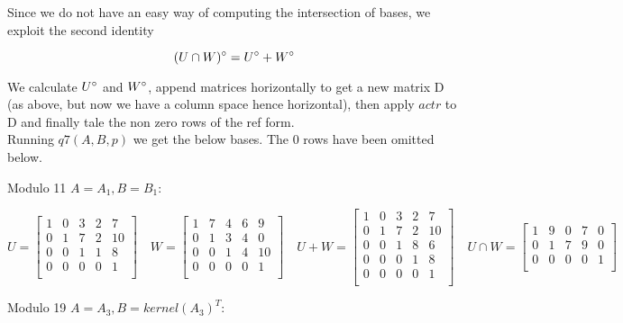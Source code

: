 \documentclass[10pt,a4paper]{report}
\begin{document}
Since we do not have an easy way of computing the intersection of bases, we exploit the second identity 

\begin{equation*}
(U \cap W)\degree = U\degree + W\degree
\end{equation*} 

We calculate $U\degree$ and $W\degree$, append matrices horizontally to get a new matrix D (as above, but now we have a column space hence horizontal), then apply $actr$ to D and finally tale the non zero rows of the ref form.\\

Running $q7(A,B,p)$ we get the below bases. The 0 rows have been omitted below.

\newpage

Modulo 11 $A=A_1, B=B_1$:

\begin{equation*}
U=\begin{bmatrix}
1 & 0 & 3 & 2 & 7 \\
0 & 1 & 7 & 2 & 10\\
0 & 0 & 1 & 1 & 8\\
0 & 0 & 0 & 0 & 1\\
\end{bmatrix}
\quad  
W=\begin{bmatrix}
1 & 7 & 4 & 6 & 9 \\
0 & 1 & 3 & 4 & 0\\
0 & 0 & 1 & 4 & 10\\
0 & 0 & 0 & 0 & 1\\
\end{bmatrix}
\quad 
U+W=\begin{bmatrix}
1 & 0 & 3 & 2 & 7 \\
0 & 1 & 7 & 2 & 10\\
0 & 0 & 1 & 8 & 6\\
0 & 0 & 0 & 1 & 8\\
0 & 0 & 0 & 0 & 1\\
\end{bmatrix}
\quad 
U \cap W=\begin{bmatrix}
1 & 9 & 0 & 7 & 0 \\
0 & 1 & 7 & 9 & 0\\
0 & 0 & 0 & 0 & 1\\
\end{bmatrix}
\end{equation*}

\vspace{1cm}

Modulo 19 $A=A_3, B=kernel(A_3)^T$:
\end{document}
